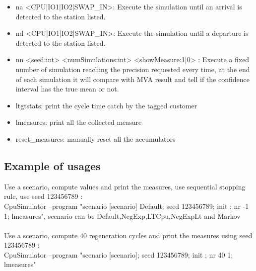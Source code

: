 \documentclass[12pt,a4paper]{article}
\begin{document}
\begin{itemize}
    \item na <CPU|IO1|IO2|SWAP\_IN>: Execute the simulation until an arrival is detected to the station listed.
    \item nd <CPU|IO1|IO2|SWAP\_IN>: Execute the simulation until a departure is detected to the station listed.
    \item nn <seed:int> <numSimulations:int> <showMeasure:1|0> : Execute a fixed number of simulation reaching the precision requested every time, at the end of each simulation it will compare with MVA result and tell if the confidence interval has the true mean or not.
    \item ltgtstats: print the cycle time catch by the tagged customer
    \item lmeasures: print all the collected measure
    \item reset\_measures: manually reset all the accumulators

\end{itemize}

\subsection{Example of usages}
Use a scenario, compute values and print the measures, use sequential stopping rule, use seed 123456789 :\\ CpuSimulator --program "scenario [scenario] Default; seed 123456789; init ; nr -1 1; lmeasures", scenario can be Default,NegExp,LTCpu,NegExpLt and Markov
\\
\\
Use a scenario, compute 40 regeneration cycles and print the measures using seed 123456789 :\\ CpuSimulator --program "scenario [scenario]; seed 123456789; init ; nr 40 1; lmeasures"
\\
\\
\end{document}
